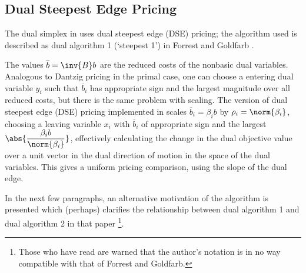 \subsection{Dual Steepest Edge Pricing}
\label{sec:DSEPricing}

The dual simplex in \dylp uses dual steepest edge (DSE) pricing; the algorithm
used is described as dual algorithm 1 (`steepest 1') in
Forrest and Goldfarb \cite{For92}.

The values $\overline{b} = \inv{B}b$ are the reduced costs of the nonbasic
dual variables.
Analogous to Dantzig pricing in the primal case, one can choose a entering
dual variable $y_i$ such that $\overline{b}_i$ has appropriate sign and the
largest magnitude over all reduced costs, but there is the same problem with
scaling.
The version of dual steepest edge (DSE) pricing implemented in \dylp
scales $\overline{b}_i = \beta_i b$ by $\rho_i = \norm{\beta_i}$,
choosing
a leaving variable $x_i$ with $\overline{b}_i$ of appropriate sign
and the largest $\displaystyle \abs{\frac{\beta_i b}{\norm{\beta_i}}}$,
effectively
calculating the change in the dual objective value over a unit vector in
the dual direction of motion in the space of the dual variables.
This gives a uniform pricing comparison, using the slope of the dual edge.

In the next few paragraphs, an alternative motivation of the algorithm is
presented which (perhaps) clarifies the relationship between dual
algorithm 1 and dual algorithm 2 in that paper%
\footnote{Those who have
read \cite{For92} are warned that the author's notation is in no way compatible
with that of Forrest and Goldfarb.}.

